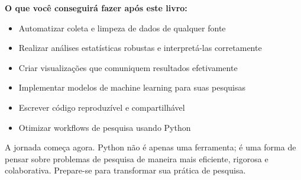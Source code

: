 \begin{examplebox}
\textbf{O que você conseguirá fazer após este livro:}
\begin{itemize}
    \item Automatizar coleta e limpeza de dados de qualquer fonte
    \item Realizar análises estatísticas robustas e interpretá-las corretamente
    \item Criar visualizações que comuniquem resultados efetivamente
    \item Implementar modelos de machine learning para suas pesquisas
    \item Escrever código reproduzível e compartilhável
    \item Otimizar workflows de pesquisa usando Python
\end{itemize}
\end{examplebox}

A jornada começa agora. Python não é apenas uma ferramenta; é uma forma de pensar sobre problemas de pesquisa de maneira mais eficiente, rigorosa e colaborativa. Prepare-se para transformar sua prática de pesquisa.

